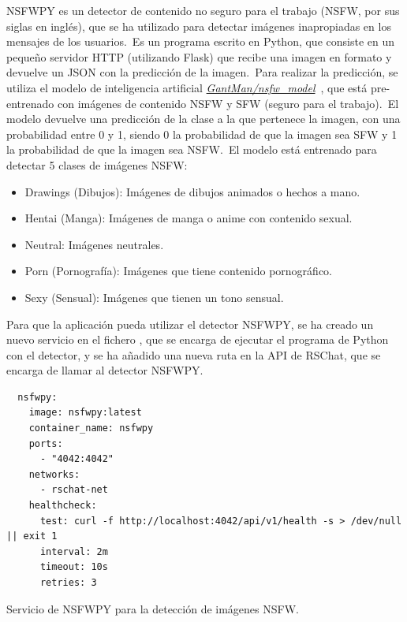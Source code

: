 NSFWPY es un detector de contenido no seguro para el trabajo (NSFW, por sus siglas en inglés), que se ha utilizado para
detectar imágenes inapropiadas en los mensajes de los usuarios.\ Es un programa escrito en Python, que consiste en
un pequeño servidor HTTP (utilizando Flask) que recibe una imagen en formato  y devuelve un JSON con
la predicción de la imagen.\ Para realizar la predicción, se utiliza el modelo de inteligencia artificial
\href{https://github.com/GantMan/nsfw_model}{\textit{GantMan/nsfw\_model}}~\cite{nsfw-model-repo},
que está pre-entrenado con imágenes de contenido NSFW y SFW (seguro para el trabajo).\ El modelo devuelve una
predicción de la clase a la que pertenece la imagen, con una probabilidad entre 0 y 1, siendo 0 la probabilidad de
que la imagen sea SFW y 1 la probabilidad de que la imagen sea NSFW\@.\ El modelo está entrenado para detectar 5
clases de imágenes NSFW:
\begin{itemize}
	\item Drawings (Dibujos): Imágenes de dibujos animados o hechos a mano.
	\item Hentai (Manga): Imágenes de manga o anime con contenido sexual.
	\item Neutral: Imágenes neutrales.
	\item Porn (Pornografía): Imágenes que tiene contenido pornográfico.
	\item Sexy (Sensual): Imágenes que tienen un tono sensual.
\end{itemize}

Para que la aplicación pueda utilizar el detector NSFWPY, se ha creado un nuevo servicio en el fichero
, que se encarga de ejecutar el programa de Python con el detector, y se ha añadido
una nueva ruta en la API de RSChat, que se encarga de llamar al detector NSFWPY\@.

\begin{codeBlock}
	\begin{verbatim}
  nsfwpy:
    image: nsfwpy:latest
    container_name: nsfwpy
    ports:
      - "4042:4042"
    networks:
      - rschat-net
    healthcheck:
      test: curl -f http://localhost:4042/api/v1/health -s > /dev/null || exit 1
      interval: 2m
      timeout: 10s
      retries: 3
	\end{verbatim}
	\caption{Servicio de NSFWPY para la detección de imágenes NSFW.}
	\label{cod:nsfw-docker-compose}
\end{codeBlock}

